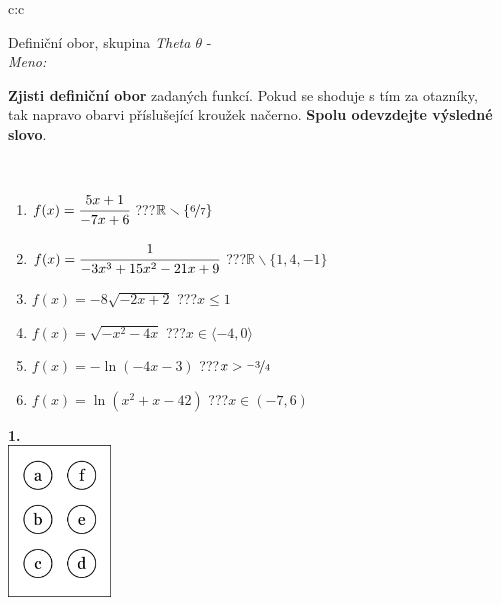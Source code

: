 \documentclass[10pt]{report}
\begin{document}
\begin{tabular}{c:c}
\begin{minipage}[c][104.5mm][t]{0.5\linewidth}
\begin{center}
\vspace{7mm}
{\huge Definiční obor, skupina \textit{Theta $\theta$} -}\\[5mm]
\textit{Meno:}\phantom{xxxxxxxxxxxxxxxxxxxxxxxxxxxxxxxxxxxxxxxxxxxxxxxxxxxxxxxxxxxxxxxxx}\\[5mm]
\begin{minipage}{0.95\linewidth}
\textbf{Zjisti definiční obor} zadaných funkcí. Pokud se shoduje s tím za otazníky,\\tak napravo obarvi příslušející kroužek načerno. \textbf{Spolu odevzdejte výsledné slovo}.
\end{minipage}
\\[1mm]
\begin{minipage}{0.79\linewidth}
\begin{center}
\begin{varwidth}{\linewidth}
\begin{enumerate}
\normalsizerrr
\item $f(x)=\cfrac{5x+1}{-7x+6}$\quad \dotfill\; ???\;\dotfill \quad $\mathbb{R}\smallsetminus\{\nicefrac{6}{7}\}$
\item $f(x)=\cfrac{1}{-3x^3+15x^2-21x+9}$\quad \dotfill\; ???\;\dotfill \quad $\mathbb{R}\smallsetminus\{1,4,-1\}$
\item $f(x)=-8\sqrt{-2x+2}$\quad \dotfill\; ???\;\dotfill \quad $x\leq1$
\item $f(x)=\sqrt{-x^2-4x}$\quad \dotfill\; ???\;\dotfill \quad $x\in\langle-4 , 0\rangle$
\item $f(x)=-\ln{(-4x-3)}$\quad \dotfill\; ???\;\dotfill \quad $x>\nicefrac{-3}{4}$
\item $f(x)=\ln{(x^2+x-42)}$\quad \dotfill\; ???\;\dotfill \quad $x\in(-7 , 6)$
\end{enumerate}
\end{varwidth}
\end{center}
\end{minipage}
\begin{minipage}{0.20\linewidth}
\begin{center}
{\Huge\bfseries 1.} \\[2mm]
\includegraphics[height=40mm]{../images/braille.png}

\end{center}
\end{minipage}
\end{center}
\end{minipage}
\end{tabular}
\end{document}
